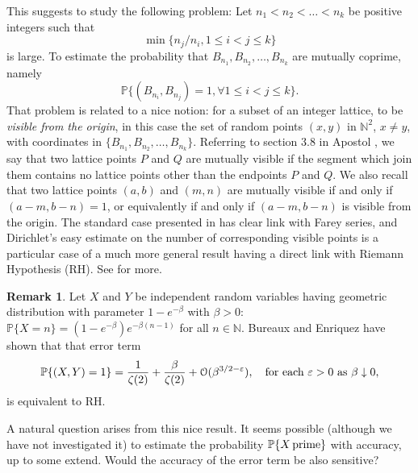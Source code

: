 \documentclass[11pt,draft,reqno]{amsart}
\theoremstyle{definition}
\theoremstyle{remarks}
\newtheorem{remark}[theorem]{{\bf  Remark}}
\numberwithin{equation}{section}
\def \b{{\beta}}
\def \e{{\varepsilon}}
\def \o{{\omega}}
\def\P{{\mathcal P}}
\def\P{{\mathbb P}}
\def\N{{\mathbb N}}
\begin{document}
This suggests to study the following problem: Let $n_1<n_2<\ldots< n_k$ be positive integers such that 
$$\min\{ n_j/n_i, 1\le i<j \le k\}$$
is large. To estimate the probability that $B_{n_1}, B_{n_2},\ldots, B_{n_k}$ are mutually coprime, namely
$$\P\big\{ (B_{n_i}, B_{n_j})=1, \forall 1\le i<j \le k\big\}.$$ 
 That problem is related to a nice notion: for a subset of an integer lattice, to be {\it visible from the origin}, in this case the   set of random points   $(x,y)$ in $\N^2$, $x\neq y$, with coordinates in $\{B_{n_1}, B_{n_2},\ldots, B_{n_k}\}$. Referring to section 3.8 in Apostol \cite{A}, we say  that two lattice points $P$ and $Q$ are mutually visible  if the segment which join  them contains no lattice points other than the endpoints $P$ and $Q$. We also recall that two lattice points $(a,b)$ and $(m,n)$ are mutually visible if  and only if $(a-m, b-n)= 1$, or  equivalently  if and only if $(a-m,b-n)$ is visible from the origin. The standard case presented in \cite{A} has clear link with Farey series, and Dirichlet's easy   estimate on the number of corresponding visible  points is a particular case of a much more general result having a direct link with Riemann Hypothesis  (RH). See   \cite{W13} for more.
\smallskip \par

 \begin{remark}\rm Let $X$ and $Y$ be independent random variables having geometric distribution with parameter $1-e^{-\b}$ with $\b>0$: $\P\{X=n\}=(1-e^{-\b})e^{-\b(n-1)}$ for all $n\in\N$. Bureaux and Enriquez \cite{BE} have shown that 
 that error term
 $$ \P\{(X,Y)=1\}= \frac{1}{\zeta(2)}+\frac{\b}{\zeta(2)}+\mathcal O(\b^{3/2-\e}), \quad \hbox{for each}\ \e>0\ \hbox{as}\ \b\downarrow 0, $$
 is equivalent to RH. 
 
 A natural question arises from this nice result. It seems possible (although we have not investigated it) to   estimate the probability $\P\{X\,\hbox{prime}\}$ with accuracy, up to some extend. Would the accuracy of the error term be also sensitive? 
 \end{remark}  

 
\end{document}

